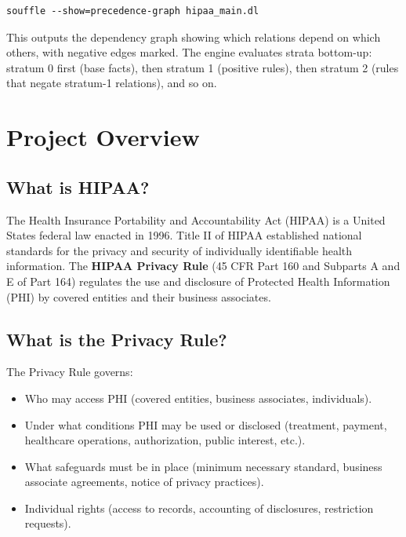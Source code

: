 \documentclass[11pt,letterpaper]{article}
\begin{document}
\begin{lstlisting}[style=bashstyle]
souffle --show=precedence-graph hipaa_main.dl
\end{lstlisting}

This outputs the dependency graph showing which relations depend on which others, with negative edges marked. The engine evaluates strata bottom-up: stratum 0 first (base facts), then stratum 1 (positive rules), then stratum 2 (rules that negate stratum-1 relations), and so on.


\section{Project Overview}
\label{sec:project-overview}

\subsection{What is HIPAA?}

The Health Insurance Portability and Accountability Act (HIPAA) is a United States federal law enacted in 1996. Title II of HIPAA established national standards for the privacy and security of individually identifiable health information. The \textbf{HIPAA Privacy Rule} (45 CFR Part 160 and Subparts A and E of Part 164) regulates the use and disclosure of Protected Health Information (PHI) by covered entities and their business associates.

\subsection{What is the Privacy Rule?}

The Privacy Rule governs:
\begin{itemize}
  \item Who may access PHI (covered entities, business associates, individuals).
  \item Under what conditions PHI may be used or disclosed (treatment, payment, healthcare operations, authorization, public interest, etc.).
  \item What safeguards must be in place (minimum necessary standard, business associate agreements, notice of privacy practices).
  \item Individual rights (access to records, accounting of disclosures, restriction requests).
\end{itemize}
\end{document}
